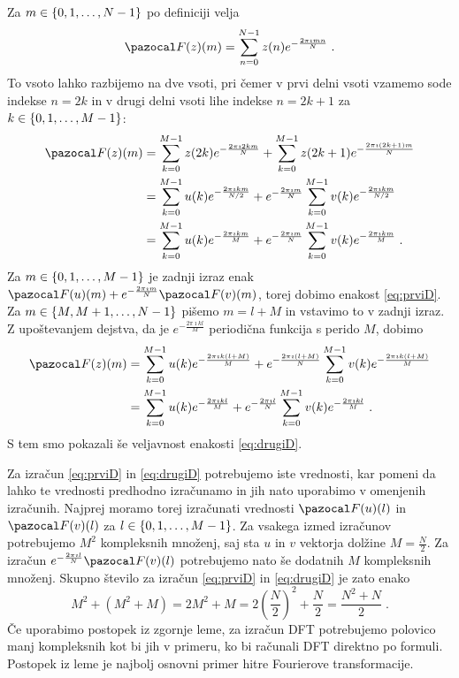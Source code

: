 \begin{dokaz}
Za $m \in \left\{0, 1, \ldots, N-1\right\}$ po definiciji velja
\begin{equation*}
  \F(z)(m) = \sum_{n=0}^{N-1} z(n) e^{-\frac{2\pi\imath mn}{N}} \;.
\end{equation*}
To vsoto lahko razbijemo na dve vsoti, pri čemer v prvi delni vsoti vzamemo sode indekse $n=2k$ in v drugi delni vsoti lihe indekse $n=2k+1$ za $k\in \left\{0, 1, \ldots, M-1\right\}$:
\begin{align*}
  \F(z)(m) & = \sum_{k=0}^{M-1} z(2k)e^{-\frac{2\pi\imath 2km}{N}} + \sum_{k=0}^{M-1} z(2k+1)e^{-\frac{2\pi\imath(2k+1)m}{N}} \\
  & = \sum_{k=0}^{M-1} u(k)e^{-\frac{2\pi\imath km}{N/2}} + e^{-\frac{2\pi \imath m}{N}}\sum_{k=0}^{M-1} v(k)e^{-\frac{2\pi\imath km}{N/2}} \\
  & = \sum_{k=0}^{M-1} u(k)e^{-\frac{2\pi\imath km}{M}} + e^{-\frac{2\pi \imath m}{N}}\sum_{k=0}^{M-1} v(k)e^{-\frac{2\pi\imath km}{M}} \;.
\end{align*}
Za $m \in \left\{0, 1, \ldots, M-1\right\}$ je zadnji izraz enak $\F(u)(m) + e^{-\frac{2\pi\imath m}{N}} \F(v)(m)$, torej dobimo enakost \eqref{eq:prviD}. Za $m \in \left\{M, M+1, \ldots, N-1\right\}$ pišemo $m = l + M$ in vstavimo to v zadnji izraz. Z upoštevanjem dejstva, da je $e^{-\frac{2\pi\imath kl}{M}}$ periodična funkcija s perido $M$, dobimo
\begin{align*}
  \F(z)(m) & = \sum_{k=0}^{M-1} u(k)e^{-\frac{2\pi\imath k(l + M)}{M}} + e^{-\frac{2\pi \imath (l + M)}{N}}\sum_{k=0}^{M-1} v(k)e^{-\frac{2\pi\imath k(l + M)}{M}} \\
  & = \sum_{k=0}^{M-1} u(k)e^{-\frac{2\pi\imath kl}{M}} + e^{-\frac{2\pi \imath l}{N}}\sum_{k=0}^{M-1} v(k)e^{-\frac{2\pi\imath kl}{M}} \;.
\end{align*}
S tem smo pokazali še veljavnost enakosti \eqref{eq:drugiD}.
\end{dokaz}
%
Za izračun \eqref{eq:prviD} in \eqref{eq:drugiD} potrebujemo iste vrednosti, kar pomeni da lahko te vrednosti predhodno izračunamo in jih nato uporabimo v omenjenih izračunih. Najprej moramo torej izračunati vrednosti $\F(u)(l)$ in $\F(v)(l)$ za $l \in \left\{0, 1, \ldots, M-1\right\}$. Za vsakega izmed izračunov potrebujemo $M^2$ kompleksnih množenj, saj sta $u$ in $v$ vektorja dolžine $M = \frac{N}{2}$. Za izračun $e^{-\frac{2\pi\imath l}{N}} \F(v)(l)$ potrebujemo nato še dodatnih $M$ kompleksnih množenj. Skupno število za izračun \eqref{eq:prviD} in \eqref{eq:drugiD} je zato enako
$$M^2 + (M^2 + M) = 2M^2 + M = 2 \left(\frac{N}{2}\right)^2 + \frac{N}{2} = \frac{N^2 + N}{2} \;.$$
Če uporabimo postopek iz zgornje leme, za izračun DFT potrebujemo polovico manj kompleksnih kot bi jih v primeru, ko bi računali DFT direktno po formuli. Postopek iz leme je najbolj osnovni primer hitre Fourierove transformacije.

